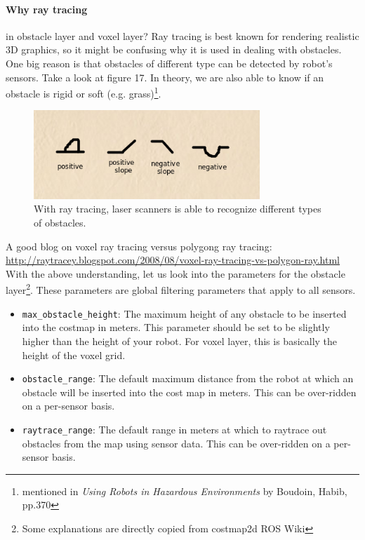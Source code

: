 \documentclass[12pt]{article}
\begin{document}
\paragraph{Why ray tracing} in obstacle layer and voxel layer? Ray tracing is best known for rendering realistic 3D graphics, so it might be confusing why it is used in dealing with obstacles. One big reason is that obstacles of different type can be detected by robot's sensors. Take a look at figure 17. In theory, we are also able to know if an obstacle is rigid or soft (e.g. grass)\footnote{ mentioned in \textit{Using Robots in Hazardous Environments} by Boudoin, Habib, pp.370}.

\begin{figure}[!h]
    \begin{center}
        \includegraphics[width=23em]{ObstacleTypes.png}
      \caption{With ray tracing, laser scanners is able to recognize different types of obstacles.}
    \end{center}
\end{figure}

A good blog on voxel ray tracing versus polygong ray tracing: \url{http://raytracey.blogspot.com/2008/08/voxel-ray-tracing-vs-polygon-ray.html} \\

With the above understanding, let us look into the parameters for the obstacle layer\footnote{Some explanations are directly copied from costmap2d ROS Wiki}. These parameters are global filtering parameters that apply to all sensors.

\begin{itemize}
\item \texttt{max\_obstacle\_height}: The maximum height of any obstacle to be inserted into the costmap in meters. This parameter should be set to be slightly higher than the height of your robot. For voxel layer, this is basically the height of the voxel grid.

\item \texttt{obstacle\_range}: The default maximum distance from the robot at which an obstacle will be inserted into the cost map in meters. This can be over-ridden on a per-sensor basis.
\item \texttt{raytrace\_range}: The default range in meters at which to raytrace out obstacles from the map using sensor data. This can be over-ridden on a per-sensor basis.
\end{itemize}
\end{document}
